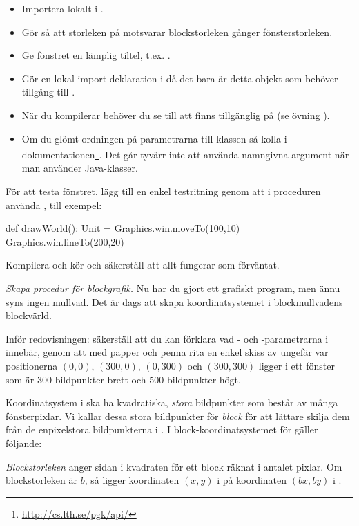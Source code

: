 \begin{itemize}%
  \item Importera  lokalt i .
  \item Gör så att storleken på  motsvarar blockstorleken gånger fönsterstorleken.
  \item Ge fönstret en lämplig tiltel, t.ex. .
  \item Gör en lokal import-deklaration i  då det bara är detta objekt som behöver tillgång till .
  \item När du kompilerar behöver du se till att  finns tillgänglig på  (se övning \texttt{\ExeWeekFOUR}).
  \item Om du glömt ordningen på parametrarna till klassen  så kolla i dokumentationen\footnote{\url{http://cs.lth.se/pgk/api/}}. Det går tyvärr inte att använda namngivna argument när man använder Java-klasser.
\end{itemize}

För att testa fönstret, lägg till en enkel testritning genom att i proceduren  använda , till exempel:
\begin{Code}
  def drawWorld(): Unit = {
    Graphics.win.moveTo(100,10)
    Graphics.win.lineTo(200,20)
  }
\end{Code}
Kompilera och kör och säkerställ att allt fungerar som förväntat.


\Task \emph{Skapa procedur för blockgrafik.} Nu har du gjort ett grafiskt program, men ännu syns ingen mullvad.
Det är dags att skapa koordinatsystemet i blockmullvadens blockvärld.

\Subtask\Pen
Inför redovisningen: säkerställ att du kan förklara vad - och -parametrarna i  innebär, genom att med papper och penna rita en enkel skiss av ungefär var positionerna $(0,0)$, $(300, 0)$, $(0, 300)$ och $(300, 300)$ ligger i ett fönster som är 300 bildpunkter brett och 500 bildpunkter högt.

\Subtask
Koordinatsystem i  ska ha kvadratiska, \emph{stora} bildpunkter som består av många fönsterpixlar. Vi kallar dessa stora bildpunkter för \emph{block} för att lättare skilja dem från de enpixelstora bildpunkterna i . I block-koordinatsystemet för  gäller följande:

\begin{framed}
\noindent \emph{Blockstorleken} anger sidan i kvadraten för ett block räknat i antalet pixlar. Om blockstorleken är $b$, så ligger koordinaten $(x, y)$ i  på koordinaten $(bx, by)$ i .

\end{framed}

